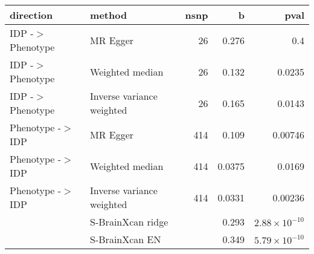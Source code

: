\begin{table}[ht]
\centering
\begin{tabular}{llrrr}
  \toprule
{\textbf{direction}} & {\textbf{method}} & {\textbf{nsnp}} & {\textbf{b}} & {\textbf{pval}} \\ 
  \midrule
IDP -$>$ Phenotype & MR Egger &   26 & 0.276 &  0.4 \\ 
  IDP -$>$ Phenotype & Weighted median &   26 & 0.132 & 0.0235 \\ 
  IDP -$>$ Phenotype & Inverse variance weighted &   26 & 0.165 & 0.0143 \\ 
  Phenotype -$>$ IDP & MR Egger &  414 & 0.109 & 0.00746 \\ 
  Phenotype -$>$ IDP & Weighted median &  414 & 0.0375 & 0.0169 \\ 
  Phenotype -$>$ IDP & Inverse variance weighted &  414 & 0.0331 & 0.00236 \\ 
   & S-BrainXcan ridge &  & 0.293 & $2.88 \times 10^{-10}$ \\ 
   & S-BrainXcan EN &  & 0.349 & $5.79 \times 10^{-10}$ \\ 
   \bottomrule
\end{tabular}
\end{table}
